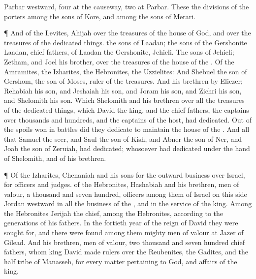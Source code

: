 {Parbar
westward,
four at the
causeway,
{}
two at
Parbar.
These
{} the
divisions of the
porters among the
sons of
Kore, and among the
sons of
Merari.
\par }{\PP {}¶ And of the
Levites,
Ahijah
{} over the
treasures of the
house of
God, and over the
treasures of the dedicated
things.
 the
sons of
Laadan; the
sons of the
Gershonite
Laadan,
chief
fathers,
{} of
Laadan the
Gershonite,
{}
Jehieli.
The
sons of
Jehieli;
Zetham, and
Joel his
brother,
{} over the
treasures of the
house of the
{}.
Of the
Amramites,
{} the
Izharites, the
Hebronites,
{} the
Uzzielites:
And
Shebuel the
son of
Gershom, the
son of
Moses,
{}
ruler of the
treasures.
And his
brethren by
Eliezer;
Rehabiah his
son, and
Jeshaiah his
son, and
Joram his
son, and
Zichri his
son, and
Shelomith his
son.
Which
Shelomith and his
brethren
{} over all the
treasures of the dedicated
things, which
David the
king, and the
chief
fathers, the
captains over
thousands and
hundreds, and the
captains of the
host, had
dedicated.
Out of the
spoils won in
battles did they
dedicate to
maintain the
house of the
{}.
And all that
Samuel the
seer, and
Saul the
son of
Kish, and
Abner the
son of
Ner, and
Joab the
son of
Zeruiah, had
dedicated;
{} whosoever had
dedicated
{} under the
hand of
Shelomith, and of his
brethren.
\par }{\PP {}¶ Of the
Izharites,
Chenaniah and his
sons
{} for the
outward
business over
Israel, for
officers and
judges.
 of the
Hebronites,
Hashabiah and his
brethren,
men of
valour, a
thousand and
seven
hundred,
{}
officers among them of
Israel on this
side
Jordan
westward in all the
business of the
{}, and in the
service of the
king.
Among the
Hebronites
{}
Jerijah the
chief,
{} among the
Hebronites, according to the
generations of his
fathers. In the
fortieth
year of the
reign of
David they were
sought for, and there were
found among them mighty
men of
valour at
Jazer of
Gilead.
And his
brethren,
men of
valour,
{} two
thousand and
seven
hundred
chief
fathers, whom
king
David made
rulers over the
Reubenites, the
Gadites, and the
half
tribe of
Manasseh, for every
matter pertaining to
God, and
affairs of the
king.

}
